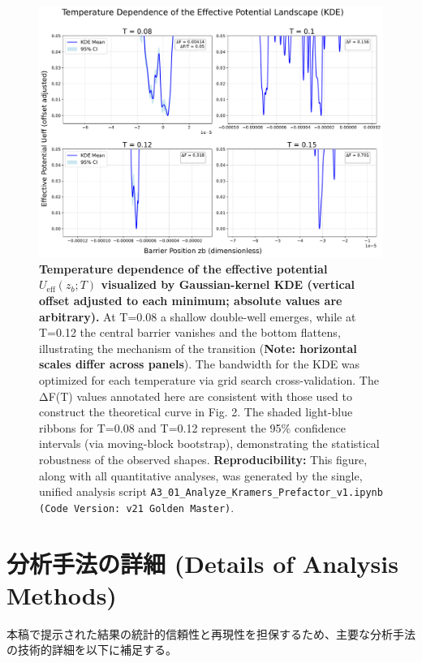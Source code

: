 \documentclass[a4paper,11pt,ja=standard,lualatex]{bxjsarticle}
\begin{document}
\begin{figure}[H]
    \centering
    \includegraphics[width=0.9\linewidth]{figures/fig3_effective_potential.pdf}
    \caption{
        \textbf{Temperature dependence of the effective potential $U_{\mathrm{eff}}(z_b; T)$ visualized by Gaussian-kernel KDE (vertical offset adjusted to each minimum; absolute values are arbitrary).}
        At T=0.08 a shallow double-well emerges, while at T=0.12 the central barrier vanishes and the bottom flattens, illustrating the mechanism of the transition (\textbf{Note: horizontal scales differ across panels}).
        The bandwidth for the KDE was optimized for each temperature via grid search cross-validation.
        The ΔF(T) values annotated here are consistent with those used to construct the theoretical curve in Fig. 2.
        The shaded light-blue ribbons for T=0.08 and T=0.12 represent the 95\% confidence intervals (via moving-block bootstrap), demonstrating the statistical robustness of the observed shapes.
        \newline\newline
        \textbf{Reproducibility:} This figure, along with all quantitative analyses, was generated by the single, unified analysis script \texttt{A3\_01\_Analyze\_Kramers\_Prefactor\_v1.ipynb (Code Version: v21 Golden Master)}.
    }
    \label{fig:effective_potential}
\end{figure}

\section{分析手法の詳細 (Details of Analysis Methods)}
\label{sec:appendix_methods}
本稿で提示された結果の統計的信頼性と再現性を担保するため、主要な分析手法の技術的詳細を以下に補足する。
\end{document}
